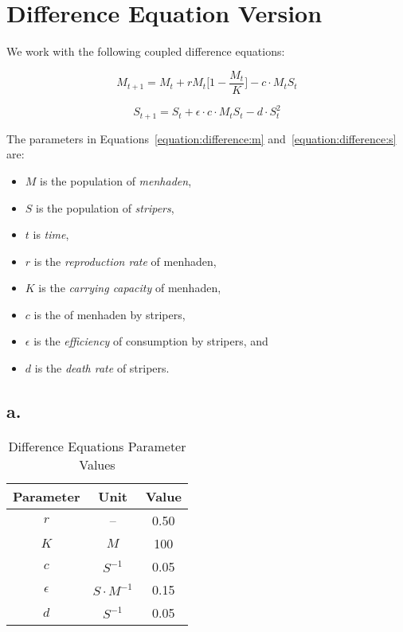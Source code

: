 \section{Difference Equation Version}
\label{sec:difference-equation-version}

We work with the following coupled difference equations:

\begin{equation}
    \label{equation:difference:m}
    M_{t + 1} = M_t + r M_t \bigg[ 1 - \frac{M_t}{K} \bigg] - c \cdot M_t S_t
\end{equation}

\begin{equation}
    \label{equation:difference:s}
    S_{t + 1} = S_t + \epsilon \cdot c \cdot M_t S_t - d \cdot S_t^{2}
\end{equation}

The parameters in Equations~\ref{equation:difference:m} and~\ref{equation:difference:s} are:

\begin{itemize}
    \item $M$ is the population of \textit{menhaden},
    \item $S$ is the population of \textit{stripers},
    \item $t$ is \textit{time},
    \item $r$ is the \textit{reproduction rate} of menhaden,
    \item $K$ is the \textit{carrying capacity} of menhaden,
    \item $c$ is the  of menhaden by stripers,
    \item $\epsilon$ is the \textit{efficiency} of consumption by stripers, and
    \item $d$ is the \textit{death rate} of stripers.
\end{itemize}


\subsection*{a.}

\begin{table}[h!]
    \begin{center}
        \begin{tabular}{c|c|c}
            \textbf{Parameter} & \textbf{Unit} & \textbf{Value} \\
            \hline
            $r$ & -- & 0.50 \\
            $K$ & $M$ & 100 \\
            $c$ & $S^{-1}$ & 0.05 \\
            $\epsilon$ & $S \cdot M^{-1}$ & 0.15 \\
            $d$ & $S^{-1}$ & 0.05 \\
        \end{tabular}
        \caption{Difference Equations Parameter Values}
        \label{table:difference-parameters}
    \end{center}
\end{table}


